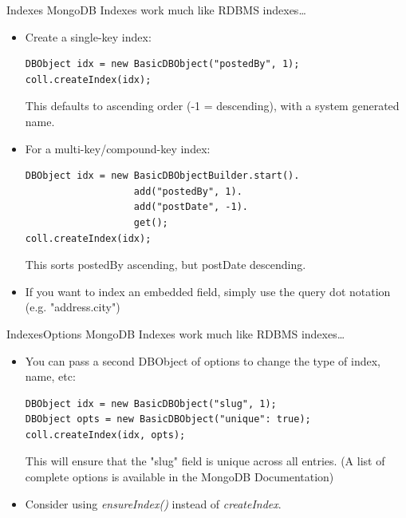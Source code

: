 \documentclass{beamer}
\begin{document}
\begin{frame}[fragile]{Indexes}
    \small MongoDB Indexes work much like RDBMS indexes\ldots
    \begin{itemize}
        \item Create a single-key index:\\ 
            \begin{lstlisting}
DBObject idx = new BasicDBObject("postedBy", 1);
coll.createIndex(idx);
            \end{lstlisting}
        This defaults to ascending order (-1 = descending), with a system generated name.
        \item For a multi-key/compound-key index:
            \begin{lstlisting}
DBObject idx = new BasicDBObjectBuilder.start().
                   add("postedBy", 1).
                   add("postDate", -1).
                   get();
coll.createIndex(idx);
            \end{lstlisting}
        This sorts postedBy ascending, but postDate descending.

    \item If you want to index an embedded field, simply use the query dot notation (e.g. "address.city")
        
    \end{itemize}
\end{frame}

\begin{frame}[fragile]{Indexes}{Options}
    \small MongoDB Indexes work much like RDBMS indexes\ldots
    \begin{itemize}
    \item You can pass a second DBObject of options to change the type of index, name, etc:
            \begin{lstlisting}
DBObject idx = new BasicDBObject("slug", 1);
DBObject opts = new BasicDBObject("unique": true);
coll.createIndex(idx, opts);
            \end{lstlisting}
            This will ensure that the "slug" field is unique across all entries.  (A list of complete options is available in the MongoDB Documentation)
        \item Consider using {\em ensureIndex()} instead of {\em createIndex}.
    \end{itemize}
\end{frame}
\end{document}
